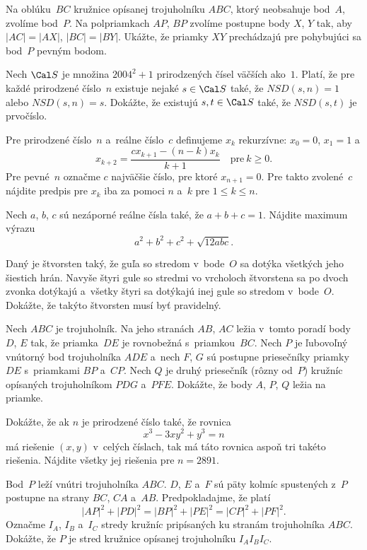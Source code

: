 {%
Na oblúku~$BC$ kružnice opísanej trojuholníku $ABC$, ktorý neobsahuje bod~$A$, zvolíme bod~$P$.
Na polpriamkach $AP$, $BP$ zvolíme postupne body $X$, $Y$ tak, aby $|AC|=|AX|$, $|BC|=|BY|$. Ukážte, že priamky $XY$ prechádzajú pre pohybujúci sa bod~$P$ pevným bodom.}

{%
Nech $\Cal S$ je množina $2004^2+1$ prirodzených čísel väčších ako~$1$. Platí, že pre každé prirodzené číslo~$n$ existuje nejaké $s\in\Cal S$ také, že $NSD(s,n)=1$ alebo $NSD(s,n)=s$. Dokážte, že existujú $s,t\in\Cal S$ také, že $NSD(s,t)$ je prvočíslo.}

{%
Pre prirodzené číslo~$n$ a~reálne číslo~$c$ definujeme $x_k$ rekurzívne: $x_0=0$, $x_1=1$ a
$$
x_{k+2}=\frac{cx_{k+1}-(n-k)x_k}{k+1}\quad\text{pre}\ k\ge 0.
$$
Pre pevné~$n$ označme $c$ najväčšie číslo, pre ktoré $x_{n+1}=0$. Pre takto zvolené~$c$ nájdite predpis pre $x_k$ iba za pomoci $n$ a~$k$ pre $1\le k\le n$.}

{%
Nech $a$, $b$, $c$ sú nezáporné reálne čísla také, že $a+b+c=1$. Nájdite maximum výrazu
$$
a^2+b^2+c^2+\sqrt{12abc}.
$$}

{%
Daný je štvorsten taký, že guľa so stredom v~bode~$O$ sa dotýka
všetkých jeho šiestich hrán. Navyše štyri gule so stredmi vo vrcholoch štvorstena
sa po dvoch zvonka dotýkajú a~všetky štyri sa dotýkajú inej gule so stredom
v~bode~$O$. Dokážte, že takýto štvorsten musí byť pravidelný.}

{%
Nech $ABC$ je trojuholník. Na jeho stranách $AB$, $AC$ ležia
v~tomto poradí body $D$, $E$ tak, že priamka~$DE$ je rovnobežná s~priamkou~$BC$.
Nech $P$ je ľubovoľný vnútorný bod trojuholníka $ADE$ a~nech $F$, $G$
sú postupne priesečníky priamky~$DE$ s~priamkami $BP$ a~$CP$. Nech $Q$ je druhý
priesečník (rôzny od~$P$) kružníc opísaných trojuholníkom $PDG$ a~$PFE$.
Dokážte, že body $A$, $P$, $Q$ ležia na priamke.}

{%
Dokážte, že ak $n$ je prirodzené číslo také, že rovnica
$$
x^3-3xy^2+y^3=n
$$
má riešenie $(x,y)$ v~celých číslach, tak má táto rovnica aspoň tri takéto riešenia.
Nájdite všetky jej riešenia pre $n=2891$.}

{%
Bod~$P$ leží vnútri trojuholníka $ABC$. $D$, $E$ a~$F$ sú päty kolmíc spustených z~$P$ postupne na strany $BC$, $CA$ a~$AB$. Predpokladajme, že platí
$$
|AP|^2 + |PD|^2 = |BP|^2 + |PE|^2 = |CP|^2 + |PF|^2.
$$
Označme $I_A$, $I_B$ a~$I_C$ stredy kružníc pripísaných ku stranám trojuholníka $ABC$. Dokážte, že $P$ je stred kružnice opísanej trojuholníku $I_AI_BI_C$.}

